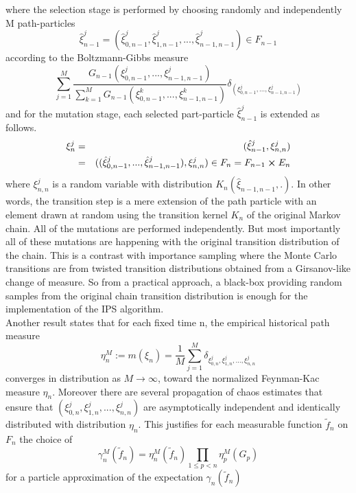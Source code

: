 where the selection stage is performed by choosing randomly and independently M path-particles
$$\hat{\xi}_{n-1}^j = (\hat{\xi}_{0,n-1}^j, \hat{\xi}_{1,n-1}^j,...,\hat{\xi}_{n-1,n-1}^j) \in F_{n-1}$$
according to the Boltzmann-Gibbs measure
\begin{equation}
\sum_{j=1}^{M} \frac{G_{n-1}(\xi_{0,n-1}^j,...,\xi_{n-1,n-1}^j)}{\sum_{k=1}^{M}G_{n-1}(\xi_{0,n-1}^k,...,\xi_{n-1,n-1}^k)} \delta_{(\xi_{0,n-1}^j,...,\xi_{n-1,n-1}^j)}
\end{equation}
and for the mutation stage, each selected part-particle $\hat{\xi}_{n-1}^j$ is extended as follows.
\begin{eqnarray*}
\xi_n^j & = & (\hat{\xi}_{n-1}^j, \xi_{n,n}^j)\\
& = & ((\hat{\xi}_{0,n-1}^j,..., \hat{\xi}_{n-1,n-1}^j), \xi_{n,n}^j) \in F_n = F_{n-1} \cross E_n
\end{eqnarray*}
where $\xi_{n,n}^j$ is a random variable with distribution $K_n(\hat{\xi}_{n-1,n-1},.)$. In other words, the transition step is a mere extension of the path particle with an element drawn at random using the transition kernel $K_n$ of the original Markov chain. All of the mutations are performed independently. But most importantly all of these mutations are happening with the original transition distribution of the chain. This is a contrast with importance sampling where the Monte Carlo transitions are from twisted transition distributions obtained from a Girsanov-like change of measure. So from a practical approach, a black-box providing random samples from the original chain transition distribution is enough for the implementation of the IPS algorithm.\\

Another result states that for each fixed time n, the empirical historical path measure
$$\eta_n^M := m(\xi_n) = \frac{1}{M} \sum_{j=1}^{M} \delta_{\xi_{0,n}^j,\xi_{1,n}^j,...,\xi_{n,n}^j}$$ converges in distribution as $M \rightarrow \infty$, toward the normalized Feynman-Kac measure $\eta_n$. Moreover there are several propagation of chaos estimates that ensure that $(\xi_{0,n}^j, \xi_{1,n}^j,...,\xi_{n,n}^j)$ are asymptotically independent and identically distributed with distribution $\eta_n$. This justifies for each measurable function $\tilde{f}_n$ on $F_n$ the choice of
\begin{equation}
\gamma_n^M(\tilde{f}_n) = \eta_n^M(\tilde{f}_n) \prod_{1\leq p <n}\eta_p^M(G_p)
\end{equation}
for a particle approximation of the expectation $\gamma_n(\tilde{f}_n)$

